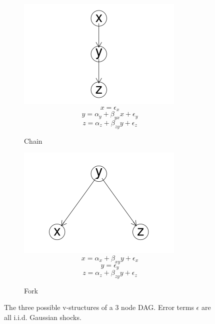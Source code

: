 \documentclass{article}
\begin{document}
\begin{figure}
\begin{subfigure}{0.3\textwidth}
    \includegraphics[width=\linewidth]{images/chain.png}
    \small
    \begin{equation*}
      x = \epsilon_{x}
    \end{equation*}
    \begin{equation*}
      y = \alpha_y + \beta_{yx} x + \epsilon_{y}
    \end{equation*}
    \begin{equation*}
      z = \alpha_z + \beta_{zy} y + \epsilon_{z}
    \end{equation*}
    \caption{Chain}
    \label{chain}
  \end{subfigure}
  \begin{subfigure}{0.3\textwidth}
    \includegraphics[width=\linewidth]{images/fork.png}
    \small
    \begin{equation*}
      x = \alpha_x + \beta_{xy} y + \epsilon_{x}
    \end{equation*}
    \begin{equation*}
      y = \epsilon_{y}
    \end{equation*}
    \begin{equation*}
      z = \alpha_z + \beta_{zy} y + \epsilon_{z}
    \end{equation*}
    \caption{Fork}
    \label{fork}
  \end{subfigure}

  \caption{The three possible v-structures of a 3 node DAG. Error terms $\epsilon$ are all i.i.d. Gaussian shocks.}
  \label{dag5}
\end{figure}
\end{document}
